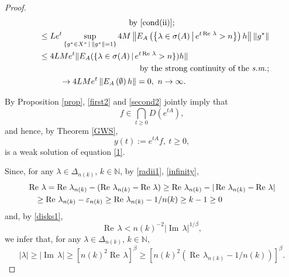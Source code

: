 \documentclass{amsart}
\theoremstyle{plain}
\theoremstyle{definition}
\begin{document}
\begin{proof}
\begin{multline}
{\hfill
\text{by \eqref{cond(ii)};}
}\\
\shoveleft{
\le Le^t\sup_{\{g^*\in X^*\,|\,\|g^*\|=1\}}4M
\left\|E_A\left(\left\{\lambda\in\sigma(A)\,\middle|\,e^{t\operatorname{Re\,}\lambda}>n\right\}\right)h\right\|\|g^*\|
}\\
\shoveleft{
\le 4LMe^t\|E_A(\{\lambda\in\sigma(A)\,|\,e^{t\operatorname{Re\,}\lambda}>n\})h\|
}\\
\hfill
\text{by the strong continuity of the {\it s.m.};}
\\
\hspace{1.2cm}
\to 4LMe^t\left\|E_A\left(\emptyset\right)h\right\|=0,\ n\to\infty.
\hfill
\end{multline}

By Proposition \ref{prop}, \eqref{first2} and \eqref{second2} jointly imply that
\[
f\in \bigcap\limits_{t\ge 0}D(e^{tA}),
\] 
and hence,
by Theorem \ref{GWS},
\[
y(t):=e^{tA}f,\ t\ge 0,
\]
is a weak solution of equation \eqref{1}.

Since, for any $\lambda \in \Delta_{n(k)}$, $k\in {{\mathbb N}}$, by \eqref{radii1}, \eqref{infinity},
\begin{multline*}
\operatorname{Re\,}\lambda =\operatorname{Re\,}\lambda_{n(k)}-(\operatorname{Re\,}\lambda_{n(k)}-\operatorname{Re\,}\lambda)
\ge
\operatorname{Re\,}\lambda_{n(k)}-|\operatorname{Re\,}\lambda_{n(k)}-\operatorname{Re\,}\lambda|
\\
\ \ \
\ge 
\operatorname{Re\,}\lambda_{n(k)}-\varepsilon_{n(k)}
\ge \operatorname{Re\,}\lambda_{n(k)}-1/n(k)\ge k-1\ge 0
\hfill
\end{multline*}
and, by \eqref{disks1},
\[
\operatorname{Re\,}\lambda<n(k)^{-2}|\operatorname{Im\,}\lambda|^{1/\beta},
\]
we infer that, for any $\lambda \in \Delta_{n(k)}$, $k\in {{\mathbb N}}$,
\begin{equation*}
|\lambda|\ge|\operatorname{Im\,}\lambda|\ge 
\left[n(k)^2\operatorname{Re\,}\lambda\right]^\beta\ge \left[n(k)^2(\operatorname{Re\,}\lambda_{n(k)}-1/n(k))\right]^\beta.
\end{equation*}


\end{proof}
\end{document}
